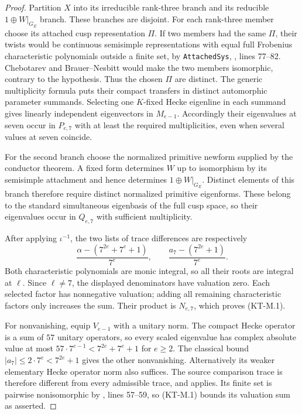 \documentclass[11pt,a4paper]{article}
\theoremstyle{definition}
\begin{document}
\begin{proof}
Partition $X$ into its irreducible rank-three branch and its
reducible $1\oplus W|_{G_E}$ branch. These branches are disjoint.
For each rank-three member choose its attached cusp representation
$\Pi$. If two members had the same $\Pi$, their twists would be
continuous semisimple representations with equal full Frobenius
characteristic polynomials outside a finite set, by
\texttt{AttachedSys},
, lines 77--82.
Chebotarev and Brauer--Nesbitt would make the two members
isomorphic, contrary to the hypothesis.
Thus the chosen $\Pi$ are distinct.
The generic multiplicity formula puts their compact transfers
in distinct automorphic parameter summands. Selecting one
$K$-fixed Hecke eigenline in each summand gives linearly
independent eigenvectors in $M_{e-1}$.
Accordingly their eigenvalues at seven occur in $P_{e,7}$ with
at least the required multiplicities, even when several values
at seven coincide.

For the second branch choose the normalized primitive newform
supplied by the conductor theorem. A fixed form determines $W$
up to isomorphism by its semisimple attachment and hence determines
$1\oplus W|_{G_E}$. Distinct elements of this branch therefore
require distinct normalized primitive eigenforms. These belong
to the standard simultaneous eigenbasis of the full cusp space,
so their eigenvalues occur in $Q_{e,7}$ with sufficient
multiplicity.

After applying $\iota^{-1}$, the two lists of trace differences
are respectively
\[
 \frac{\alpha-(7^{2e}+7^e+1)}{7^e},\qquad
 \frac{a_7-(7^{2e}+1)}{7^e}.
\]
Both characteristic polynomials are monic integral, so all their
roots are integral at $\ell$. Since $\ell\ne7$, the displayed
denominators have valuation zero. Each selected factor has
nonnegative valuation; adding all remaining characteristic
factors only increases the sum. Their product is $N_{e,7}$,
which proves (KT-M.1).

For nonvanishing, equip $V_{e-1}$ with a unitary norm.
The compact Hecke operator is a sum of $57$ unitary operators,
so every scaled eigenvalue has complex absolute value at most
$57\cdot7^{e-1}<7^{2e}+7^e+1$ for $e\geq2$.
The classical bound $|a_7|\leq2\cdot7^e<7^{2e}+1$ gives the
other nonvanishing. Alternatively its weaker elementary Hecke
operator norm also suffices.
The source comparison trace is therefore different from every
admissible trace, and  applies.
Its finite set is pairwise nonisomorphic by
, lines 57--59, so (KT-M.1) bounds its
valuation sum as asserted.
\end{proof}
\end{document}
